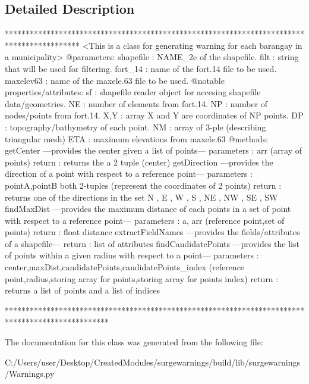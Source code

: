 \subsection{Detailed Description}
\begin{DoxyVerb}******************************************************************************************
<This is a class for generating warning for each barangay in a municipality>
@parameters:
    shapefile   : NAME_2e of the shapefile.
    filt        : string that will be used for filtering.
    fort_14     : name of the fort.14 file to be used.
    maxelev63   : name of the maxele.63 file to be used.
@notable properties/attributes:
    sf          : shapefile reader object for accesing shapefile data/geometries.
    NE          : number of elements from fort.14.
    NP          : number of nodes/points from fort.14.
    X,Y         : array X and Y are coordinates of NP points.
    DP          : topography/bathymetry of each point.
    NM          : array of 3-ple (describing triangular mesh)
    ETA         : maximum elevations from maxele.63
@methods:
    getCenter
        ---provides the center given a list of points---
        parameters  : arr (array of points)
        return      : returns the a 2 tuple (center)        
    getDirection 
        ---provides the direction of a point with respect to a reference point---
        parameters  : pointA,pointB both 2-tuples (represent the coordinates of 2 points)
        return      : returns one of the directions in the set {N , E , W , S , NE , NW , SE , SW}  
    findMaxDist
        ---provides the maximum distance of each points in a set of point with respect to a reference point---
        parameters  : a, arr (reference point,set of points)
        return      : float distance
    extractFieldNames
        ---provides the fields/attributes of a shapefile---
        return      : list of attributes
    findCandidatePoints
        ---provides the list of points  within a given radius with respect to a point---
        parameters  : center,maxDist,candidatePoints,candidatePoints_index (reference point,radius,storing array for points,storing array for points index)
        return      : returns a list of points and a list of indices
    
*************************************************************************************************\end{DoxyVerb}
 

The documentation for this class was generated from the following file\+:\begin{DoxyCompactItemize}
\item 
C\+:/\+Users/user/\+Desktop/\+Created\+Modules/surgewarnings/build/lib/surgewarnings/Warnings.\+py\end{DoxyCompactItemize}
